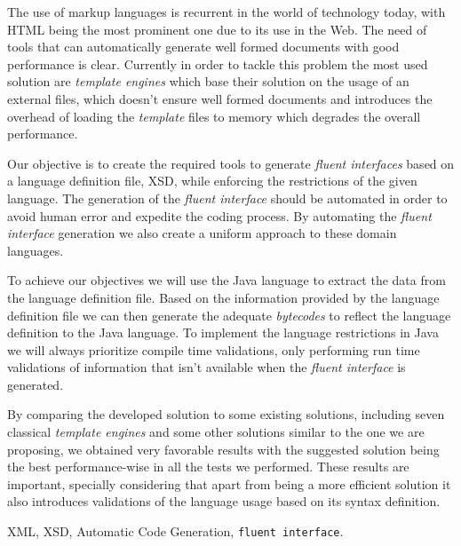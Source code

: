 \abstractEN %

The use of markup languages is recurrent in the world of technology today, with \ac{HTML} being the most prominent one due to its use in the Web. The need of tools that can automatically generate well formed documents with good performance is clear. Currently in order to tackle this problem the most used solution are \textit{template engines} which base their solution on the usage of an external files, which doesn't ensure well formed documents and introduces the overhead of loading the \textit{template} files to memory which degrades the overall performance.

\noindent
Our objective is to create the required tools to generate \textit{fluent interfaces} based on a language definition file, \ac{XSD}, while enforcing the restrictions of the given language. The generation of the \textit{fluent interface} should be automated in order to avoid human error and expedite the coding process. By automating the \textit{fluent interface} generation we also create a uniform approach to these domain languages.  

\noindent
To achieve our objectives we will use the Java language to extract the data from the language definition file. Based on the information provided by the language definition file we can then generate the adequate \textit{bytecodes} to reflect the language definition to the Java language. To implement the language restrictions in Java we will always prioritize compile time validations, only performing run time validations of information that isn't available when the \textit{fluent interface} is generated.

\noindent
By comparing the developed solution to some existing solutions, including seven classical \textit{template engines} and some other solutions similar to the one we are proposing, we obtained very favorable results with the suggested solution being the best performance-wise in all the tests we performed. These results are important, specially considering that apart from being a more efficient solution it also introduces validations of the language usage based on its syntax definition.

\begin{keywords}
XML, XSD, Automatic Code Generation, \texttt{fluent interface}.
\end{keywords} 
